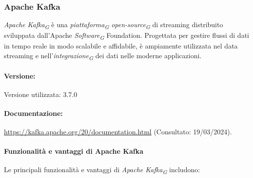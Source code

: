 \subsubsection{Apache Kafka}
\textit{Apache Kafka}\textsubscript{\textit{G}} è una \textit{piattaforma}\textsubscript{\textit{G}} \textit{open-source}\textsubscript{\textit{G}} di streaming distribuito sviluppata dall'Apache \textit{Software}\textsubscript{\textit{G}} Foundation. Progettata per gestire flussi di dati in tempo reale in modo scalabile e affidabile, è ampiamente utilizzata nel data streaming e nell'\textit{integrazione}\textsubscript{\textit{G}} dei dati nelle moderne applicazioni.

\paragraph{Versione:}
Versione utilizzata: 3.7.0

\paragraph{Documentazione:}
\url{https://kafka.apache.org/20/documentation.html} (Consultato: 19/03/2024).

\paragraph{Funzionalità e vantaggi di Apache Kafka}
Le principali funzionalità e vantaggi di \textit{Apache Kafka}\textsubscript{\textit{G}} includono:

